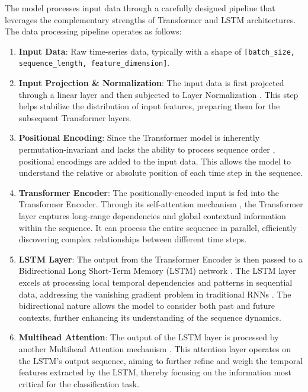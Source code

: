 The model processes input data through a carefully designed pipeline that leverages the complementary strengths of Transformer and LSTM architectures. The data processing pipeline operates as follows:

\begin{enumerate}
    \item \textbf{Input Data}: Raw time-series data, typically with a shape of \texttt{[batch\_size, sequence\_length, feature\_dimension]}.
    \item \textbf{Input Projection \& Normalization}: The input data is first projected through a linear layer and then subjected to Layer Normalization \citep{ba2016layer}. This step helps stabilize the distribution of input features, preparing them for the subsequent Transformer layers.
    \item \textbf{Positional Encoding}: Since the Transformer model is inherently permutation-invariant and lacks the ability to process sequence order \citep{vaswani2017attention}, positional encodings are added to the input data. This allows the model to understand the relative or absolute position of each time step in the sequence.
    \item \textbf{Transformer Encoder}: The positionally-encoded input is fed into the Transformer Encoder. Through its self-attention mechanism \citep{bahdanau2015neural, vaswani2017attention}, the Transformer layer captures long-range dependencies and global contextual information within the sequence. It can process the entire sequence in parallel, efficiently discovering complex relationships between different time steps.
    \item \textbf{LSTM Layer}: The output from the Transformer Encoder is then passed to a Bidirectional Long Short-Term Memory (LSTM) network \citep{hochreiter1997long}. The LSTM layer excels at processing local temporal dependencies and patterns in sequential data, addressing the vanishing gradient problem in traditional RNNs \citep{pascanu2013difficulty}. The bidirectional nature allows the model to consider both past and future contexts, further enhancing its understanding of the sequence dynamics.
    \item \textbf{Multihead Attention}: The output of the LSTM layer is processed by another Multihead Attention mechanism \citep{vaswani2017attention}. This attention layer operates on the LSTM's output sequence, aiming to further refine and weigh the temporal features extracted by the LSTM, thereby focusing on the information most critical for the classification task.

\end{enumerate}
